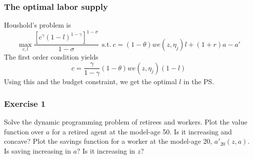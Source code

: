 \documentclass{article} %
\theoremstyle{definition}
\begin{document}
\subsubsection*{The optimal labor supply}
Houshold's problem is
\begin{equation}
  \label{eq:1}
  \max_{c,l} \frac{\left[c^{\gamma}(1-l)^{1-\gamma}\right]^{1-\sigma}}{1-\sigma} \ \  \text{s.t.} \ c = (1-\theta)we(z,\eta_j)l + (1+r)a -a'
\end{equation}
The first order condition yields
\begin{equation}
  \label{eq:2}
  c = \frac{\gamma}{1-\gamma}(1-\theta)we(z,\eta_j)(1-l)
\end{equation}
Using this and the budget constraint, we get the optimal $l$ in the PS. 

\subsubsection*{Exercise 1}
	Solve the dynamic programming problem of retirees and workers. Plot the value function over $ a $ for a retired agent at the model-age 50. Is it increasing and concave? Plot the savings function for a worker at the
	model-age 20, $ a'_{20}(z, a) $. Is saving increasing in $ a $? Is it increasing in $ z $?
\end{document}
